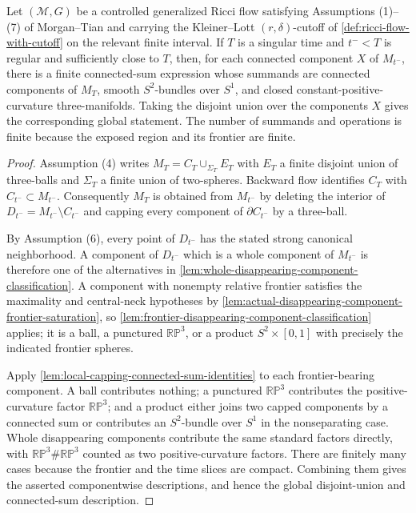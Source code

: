 \begin{theorem}
\label{thm:morgan-tian-proposition-15-3}
\notready
Let $({\mathcal M},G)$ be a controlled generalized Ricci flow satisfying
Assumptions (1)--(7) of Morgan--Tian and carrying the Kleiner--Lott
$(r,\delta)$-cutoff of \ref{def:ricci-flow-with-cutoff} on the relevant
finite interval.  If $T$ is a singular time and $t^-<T$ is regular and
sufficiently close to $T$, then, for each connected component $X$ of
$M_{t^-}$, there is a finite connected-sum expression whose summands are
connected components of $M_T$, smooth $S^2$-bundles over $S^1$, and closed
constant-positive-curvature three-manifolds.  Taking the disjoint union over
the components $X$ gives the corresponding global statement.  The number of
summands and operations is finite because the exposed region and its frontier
are finite.
\end{theorem}

\begin{proof}
Assumption (4) writes $M_T=C_T\cup_{\Sigma_T}E_T$ with $E_T$ a finite
disjoint union of three-balls and $\Sigma_T$ a finite union of two-spheres.
Backward flow identifies $C_T$ with $C_{t^-}\subset M_{t^-}$.  Consequently
$M_T$ is obtained from $M_{t^-}$ by deleting the interior of
$D_{t^-}=M_{t^-}\setminus C_{t^-}$ and capping every component of
$\partial C_{t^-}$ by a three-ball.

  By Assumption (6), every point of $D_{t^-}$ has the stated strong
  canonical neighborhood.  A component of $D_{t^-}$ which is a whole
  component of $M_{t^-}$ is therefore one of the alternatives in
  \ref{lem:whole-disappearing-component-classification}.  A component with
  nonempty relative frontier satisfies the maximality and central-neck
  hypotheses by
  \ref{lem:actual-disappearing-component-frontier-saturation}, so
  \ref{lem:frontier-disappearing-component-classification} applies;
it is a ball, a punctured $\mathbb{RP}^3$, or a product
$S^2\times[0,1]$ with precisely the indicated frontier spheres.

Apply \ref{lem:local-capping-connected-sum-identities} to each
frontier-bearing component.  A ball contributes nothing; a punctured
$\mathbb{RP}^3$ contributes the positive-curvature factor
$\mathbb{RP}^3$; and a product either joins two capped components by a
connected sum or contributes an $S^2$-bundle over $S^1$ in the
nonseparating case.  Whole disappearing components contribute the same
standard factors directly, with
$\mathbb{RP}^3\#\mathbb{RP}^3$ counted as two positive-curvature factors.
There are finitely many cases because the frontier and the time slices are
compact.  Combining them gives the asserted componentwise descriptions, and
hence the global disjoint-union and connected-sum description.
\end{proof}

